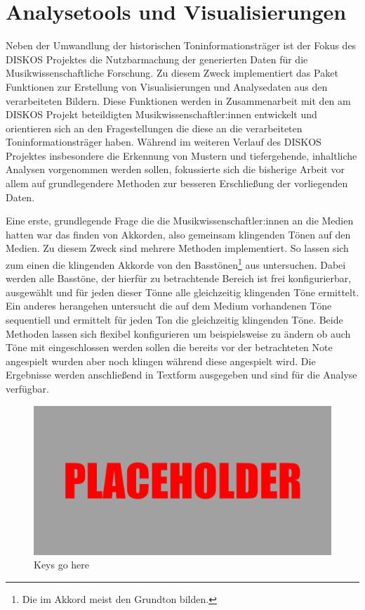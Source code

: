 \FloatBarrier
\section{Analysetools und Visualisierungen}

Neben der Umwandlung der historischen Toninformationsträger ist der Fokus des DISKOS Projektes die Nutzbarmachung der generierten Daten für die Musikwissenschaftliche Forschung.
Zu diesem Zweck implementiert das  Paket Funktionen zur Erstellung von Visualisierungen und Analysedaten aus den verarbeiteten Bildern.
Diese Funktionen werden in Zusammenarbeit mit den am DISKOS Projekt beteildigten Musikwissenschaftler:innen entwickelt und orientieren sich an den Fragestellungen die diese an die verarbeiteten Toninformationsträger haben.
Während im weiteren Verlauf des DISKOS Projektes insbesondere die Erkennung von Mustern und tiefergehende, inhaltliche Analysen vorgenommen werden sollen, fokussierte sich die bisherige Arbeit vor allem auf grundlegendere Methoden zur besseren Erschließung der vorliegenden Daten.

Eine erste, grundlegende Frage die die Musikwissenschaftler:innen an die Medien hatten war das finden von Akkorden, also gemeinsam klingenden Tönen auf den Medien.
Zu diesem Zweck sind mehrere Methoden implementiert.
So lassen sich zum einen die klingenden Akkorde von den Basstönen\footnote{Die im Akkord meist den Grundton bilden.} aus untersuchen.
Dabei werden alle Basstöne, der hierfür zu betrachtende Bereich ist frei konfigurierbar, ausgewählt und für jeden dieser Tönne alle gleichzeitig klingenden Töne ermittelt.
Ein anderes herangehen untersucht die auf dem Medium vorhandenen Töne sequentiell und ermittelt für jeden Ton die gleichzeitig klingenden Töne.
Beide Methoden lassen sich flexibel konfigurieren um beispielsweise zu ändern ob auch Töne mit eingeschlossen werden sollen die bereits vor der betrachteten Note angespielt wurden aber noch klingen während diese angespielt wird.
Die Ergebnisse werden anschließend in Textform ausgegeben und sind für die Analyse verfügbar.

\begin{figure}[t]
    \centering
    \includegraphics[width=\textwidth]{graphics/placeholder.png}
    \caption{Keys go here}
    \label{keys}
\end{figure}

